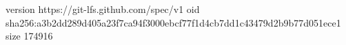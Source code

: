 version https://git-lfs.github.com/spec/v1
oid sha256:a3b2dd289d405a23f7ca94f3000ebcf77f1d4cb7dd1c43479d2b9b77d051ece1
size 174916
